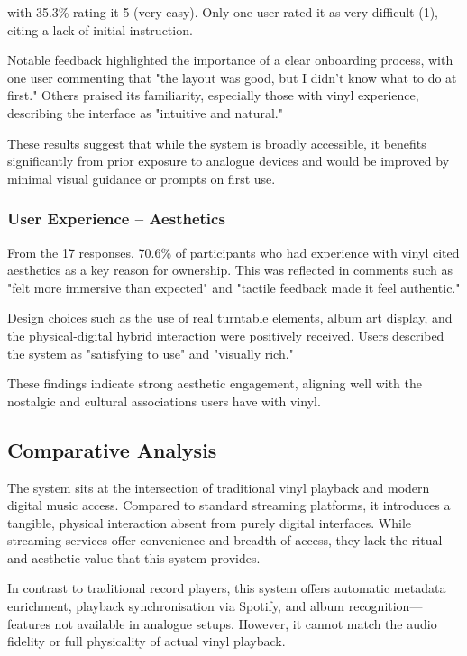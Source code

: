                     with 35.3\% rating it 5 (very easy).
                    Only one user rated it as very difficult (1), citing a lack of initial instruction.
                
                Notable feedback highlighted the importance of a clear onboarding process, with one user commenting that "the layout was good, but I didn’t know what to do at first." Others praised its familiarity, especially those with vinyl experience, describing the interface as "intuitive and natural."
                
                These results suggest that while the system is broadly accessible, it benefits significantly from prior exposure to analogue devices and would be improved by minimal visual guidance or prompts on first use.
    
            \subsubsection{User Experience -- Aesthetics}
                From the 17 responses, 70.6\% of participants who had experience with vinyl cited aesthetics as a key reason for ownership. This was reflected in comments such as "felt more immersive than expected" and "tactile feedback made it feel authentic."
    
                Design choices such as the use of real turntable elements, album art display, and the physical-digital hybrid interaction were positively received. Users described the system as "satisfying to use" and "visually rich."
                
                These findings indicate strong aesthetic engagement, aligning well with the nostalgic and cultural associations users have with vinyl.
            
        \subsection{Comparative Analysis}
            
            The system sits at the intersection of traditional vinyl playback and modern digital music access. Compared to standard streaming platforms, it introduces a tangible, physical interaction absent from purely digital interfaces. While streaming services offer convenience and breadth of access, they lack the ritual and aesthetic value that this system provides.
    
            In contrast to traditional record players, this system offers automatic metadata enrichment, playback synchronisation via Spotify, and album recognition—features not available in analogue setups. However, it cannot match the audio fidelity or full physicality of actual vinyl playback.
            
